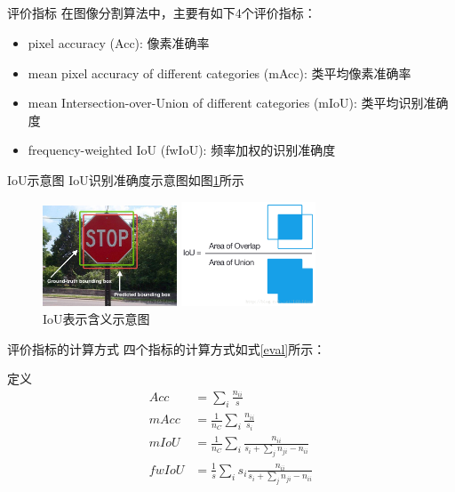 \documentclass{beamer}
\begin{document}
\subsection*{}
\begin{frame}{评价指标}
在图像分割算法中，主要有如下4个评价指标：
\begin{itemize}
	\item pixel accuracy (Acc): 像素准确率
	\item mean pixel accuracy of different categories (mAcc): 类平均像素准确率
	\item mean Intersection-over-Union of different categories (mIoU): 类平均识别准确度
	\item frequency-weighted IoU (fwIoU): 频率加权的识别准确度
\end{itemize}
\end{frame}

\begin{frame}{IoU示意图}
IoU识别准确度示意图如图\ref{IoU}所示
\begin{figure}
	\centering
	\begin{minipage}[t]{0.45\textwidth}
		\centering
		\includegraphics[width=4cm]{images/IoU1.jpg}
	\end{minipage}
	\begin{minipage}[t]{0.45\textwidth}
		\centering
		\includegraphics[width=4cm]{images/IoU2.png}
	\end{minipage}
	\caption{\label{IoU}IoU表示含义示意图}
\end{figure}
\end{frame}

\begin{frame}{评价指标的计算方式}
四个指标的计算方式如式\ref{eval}所示：
\begin{block}{定义}
	\begin{equation}
	\label{eval}
	\begin{aligned}
	Acc &= \sum_{i}\frac{n_{ii}}{s} \\
	mAcc &= \frac{1}{n_C}\sum_{i}\frac{n_{ii}}{s_i} \\
	mIoU &= \frac{1}{n_C}\sum_{i}\frac{n_{ii}}{s_i+\sum_{j}n_{ji}-n_{ii}} \\
	fwIoU &= \frac{1}{s}\sum_{i}s_i\frac{n_{ii}}{s_i+\sum_{j}n_{ji}-n_{ii}}
	\end{aligned}
	\end{equation}
\end{block}
\end{frame}
\end{document}
